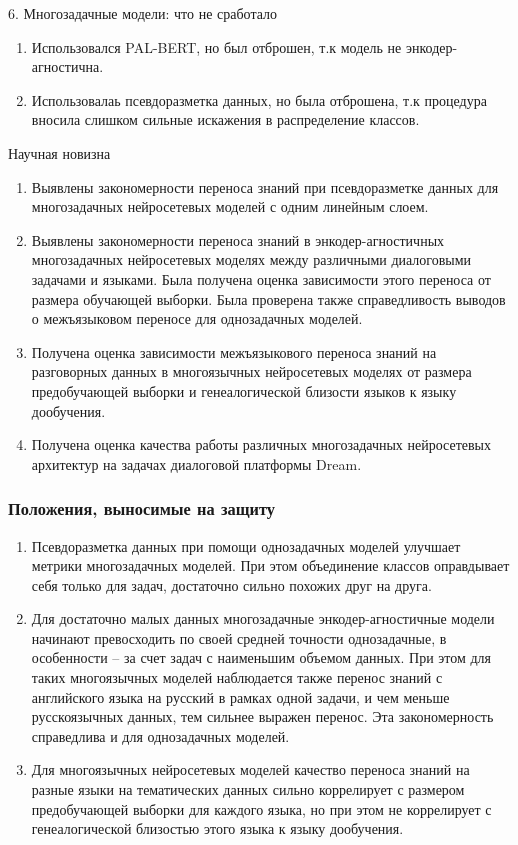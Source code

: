 \begin{frame}{6. Многозадачные модели: что не сработало}
\begin{enumerate}
\item Использовался PAL-BERT, но был отброшен, т.к модель не энкодер-агностична.
\item Использовалаь псевдоразметка данных, но была отброшена, т.к процедура вносила слишком сильные искажения в распределение классов.
\end{enumerate}
\end{frame}


\begin{frame}{Научная новизна}
\begin{enumerate}
  \item {Выявлены закономерности переноса знаний при псевдоразметке данных для многозадачных нейросетевых моделей с одним линейным слоем.}
  \item {Выявлены закономерности переноса знаний в энкодер-агностичных многозадачных нейросетевых моделях между различными диалоговыми задачами и языками. Была получена оценка зависимости этого переноса от размера обучающей выборки. Была проверена также справедливость выводов о межъязыковом переносе для однозадачных моделей.}
  \item {Получена оценка зависимости межъязыкового переноса знаний на разговорных данных в многоязычных нейросетевых моделях от размера предобучающей выборки и генеалогической близости языков к языку дообучения.}
  \item {Получена оценка качества работы различных многозадачных нейросетевых архитектур на задачах диалоговой платформы Dream.}
\end{enumerate}    
\end{frame}

\begin{frame}
    \frametitle{Положения, выносимые на защиту}
    \begin{enumerate}
  \item {Псевдоразметка данных при помощи однозадачных моделей улучшает метрики многозадачных моделей. При этом объединение классов оправдывает себя только для задач, достаточно сильно похожих друг на друга.}
  \item {Для достаточно малых данных многозадачные энкодер-агностичные модели начинают превосходить по своей средней точности однозадачные, в особенности -- за счет задач с наименьшим объемом данных. При этом для таких многоязычных моделей наблюдается также перенос знаний с английского языка на русский в рамках одной задачи, и чем меньше русскоязычных данных, тем сильнее выражен перенос. Эта закономерность справедлива и для однозадачных моделей.}
  \item {Для многоязычных нейросетевых моделей качество переноса знаний на разные языки на тематических данных сильно коррелирует с размером предобучающей выборки для каждого языка, но при этом не коррелирует с генеалогической близостью этого языка к языку дообучения.}
    \end{enumerate}
\end{frame}

